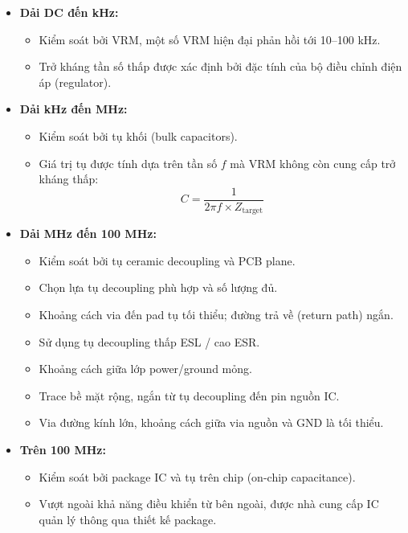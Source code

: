                 \begin{itemize}
                    \item \textbf{Dải DC đến kHz:}
                    \begin{itemize}
                        \item Kiểm soát bởi VRM, một số VRM hiện đại phản hồi tới 10–100 kHz.
                        \item Trở kháng tần số thấp được xác định bởi đặc tính của bộ điều chỉnh điện áp (regulator).
                    \end{itemize}
                
                    \item \textbf{Dải kHz đến MHz:}
                    \begin{itemize}
                        \item Kiểm soát bởi tụ khối (bulk capacitors).
                        \item Giá trị tụ được tính dựa trên tần số $f$ mà VRM không còn cung cấp trở kháng thấp:
                        \begin{equation}
                            C = \frac{1}{2\pi f \times Z_{\text{target}}}
                        \end{equation}
                    \end{itemize}
                
                    \item \textbf{Dải MHz đến 100 MHz:}
                    \begin{itemize}
                        \item Kiểm soát bởi tụ ceramic decoupling và PCB plane.
                        \item Chọn lựa tụ decoupling phù hợp và số lượng đủ.
                        \item Khoảng cách via đến pad tụ tối thiểu; đường trả về (return path) ngắn.
                        \item Sử dụng tụ decoupling thấp ESL / cao ESR.
                        \item Khoảng cách giữa lớp power/ground mỏng.
                        \item Trace bề mặt rộng, ngắn từ tụ decoupling đến pin nguồn IC.
                        \item Via đường kính lớn, khoảng cách giữa via nguồn và GND là tối thiểu.
                    \end{itemize}
                
                    \item \textbf{Trên 100 MHz:}
                    \begin{itemize}
                        \item Kiểm soát bởi package IC và tụ trên chip (on-chip capacitance).
                        \item Vượt ngoài khả năng điều khiển từ bên ngoài, được nhà cung cấp IC quản lý thông qua thiết kế package.
                    \end{itemize}
                \end{itemize}
                
